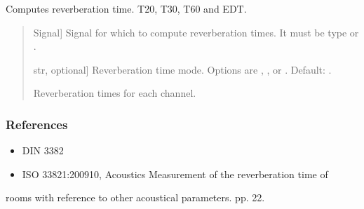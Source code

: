 \documentclass[letterpaper,10pt,english]{sphinxmanual}
\begin{document}
\begin{fulllineitems}
\label{\detokenize{modules/dsptoolbox.room_acoustics:dsptoolbox.room_acoustics.reverb_time}}
\pysigstartsignatures
{}
\pysigstopsignatures
\sphinxAtStartPar
Computes reverberation time. T20, T30, T60 and EDT.
\begin{quote}\begin{description}
\begin{description}
\sphinxlineitem{\sphinxstylestrong{signal}}{[}Signal{]}
\sphinxAtStartPar
Signal for which to compute reverberation times. It must be type
 or .

\sphinxlineitem{\sphinxstylestrong{mode}}{[}str, optional{]}
\sphinxAtStartPar
Reverberation time mode. Options are , ,  or
. Default: .

\end{description}

\begin{description}
\sphinxlineitem{\sphinxstylestrong{reverberation\_times}}{[}\sphinxtitleref{np.ndarray}{]}
\sphinxAtStartPar
Reverberation times for each channel.

\end{description}

\end{description}\end{quote}
\subsubsection*{References}
\begin{itemize}
\item {} 
\sphinxAtStartPar
DIN 3382

\item {} 
\sphinxAtStartPar
ISO 3382\sphinxhyphen{}1:2009\sphinxhyphen{}10, Acoustics \sphinxhyphen{} Measurement of the reverberation time of

\end{itemize}

\sphinxAtStartPar
rooms with reference to other acoustical parameters. pp. 22.

\end{fulllineitems}
\end{document}
